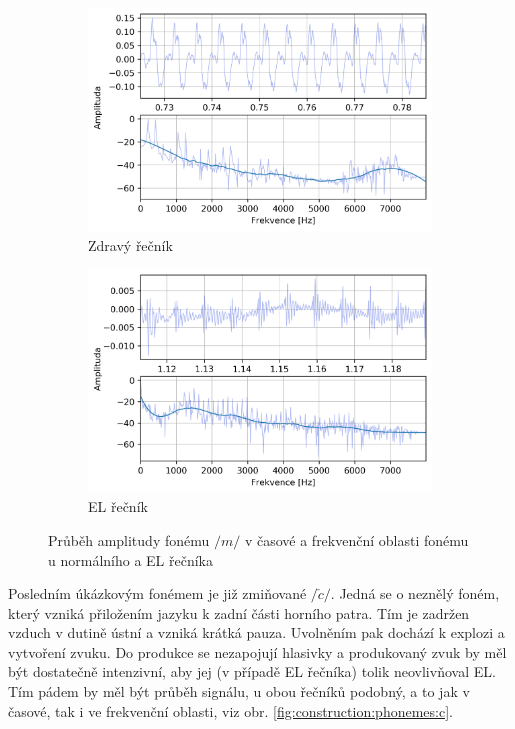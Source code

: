 \begin{figure}[htpb]
  \centering
  \begin{subfigure}[b]{0.45\textwidth}
    \includegraphics[width=\textwidth]{./ch5-construction/img/signal-normal_m.png}
    \caption{Zdravý řečník}
    \label{fig:construction:phonemes:m:normal}
  \end{subfigure}
  \begin{subfigure}[b]{0.45\textwidth}
    \includegraphics[width=\textwidth]{./ch5-construction/img/signal-el_m.png}
    \caption{EL řečník}
    \label{fig:construction:phonemes:m:el}
  \end{subfigure}
  \caption{Průběh amplitudy fonému $/m/$ v časové a frekvenční oblasti fonému u normálního a EL řečníka}
  \label{fig:construction:phonemes:m}
\end{figure}

Posledním úkázkovým fonémem je již zmiňované $/\check{c}/$. Jedná se o neznělý foném, který vzniká přiložením jazyku k zadní části horního patra. Tím je zadržen vzduch v dutině ústní a vzniká krátká pauza. Uvolněním pak dochází k explozi a vytvoření zvuku. \cite{Psutka2006} Do produkce se nezapojují hlasivky a produkovaný zvuk by měl být dostatečně intenzivní, aby jej (v případě EL řečníka) tolik neovlivňoval EL. Tím pádem by měl být průběh signálu, u obou řečníků podobný, a to jak v časové, tak i ve frekvenční oblasti, viz obr. \ref{fig:construction:phonemes:c}.


